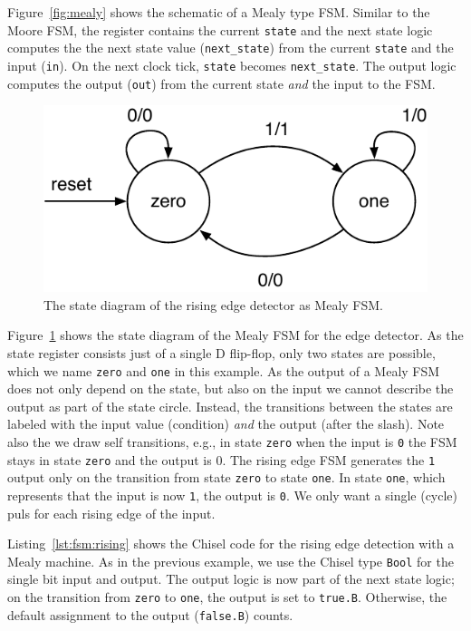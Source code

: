 \documentclass[%
    10pt,
    headinclude, footexclude,
    openright, %
    notitlepage,
    cleardoubleempty,
    headsepline,
    pointlessnumbers,
    bibtotoc, idxtotoc,
    ]{scrbook}
\newcommand{\code}[1]{{\small{\texttt{#1}}}}
\newcommand{\scale}{0.7}
\begin{document}
Figure~\ref{fig:mealy} shows the schematic of a Mealy type FSM.
Similar to the Moore FSM, the register contains the current \code{state} and
the next state logic computes the the next state value (\code{next\_state})
from the current \code{state} and the input (\code{in}).
On the next clock tick, \code{state} becomes \code{next\_state}.
The output logic computes the output (\code{out}) from the current state
\emph{and} the input to the FSM.


\begin{figure}
  \centering
  \includegraphics[scale=\scale]{figures/state-diag-mealy}
  \caption{The state diagram of the rising edge detector as Mealy FSM.}
  \label{fig:diag:mealy}
\end{figure}

Figure~\ref{fig:diag:mealy} shows the state diagram of the Mealy FSM for the
edge detector. As the state register consists just of a single D flip-flop,
only two states are possible, which we name \code{zero} and \code{one} in this
example.
As the output of a Mealy FSM does not only depend on the state, but also
on the input we cannot describe the output as part of the state circle.
Instead, the transitions between the states are labeled with the input
value (condition) \emph{and} the output (after the slash).
Note also the we draw self transitions, e.g., in state \code{zero} when
the input is \code{0} the FSM stays in state \code{zero} and the output is {0}.
The rising edge FSM generates the \code{1} output only on the transition
from state \code{zero} to state \code{one}. In state \code{one}, which represents
that the input is now \code{1}, the output is \code{0}. We only want a single (cycle)
puls for each rising edge of the input.


Listing~\ref{lst:fsm:rising} shows the Chisel code for the rising edge detection
with a Mealy machine.
As in the previous example, we use the Chisel type \code{Bool} for the
single bit input and output.
The output logic is now part of the next state logic; on the transition from
\code{zero} to \code{one}, the output is set to \code{true.B}. Otherwise,
the default assignment to the output (\code{false.B}) counts.
\end{document}
